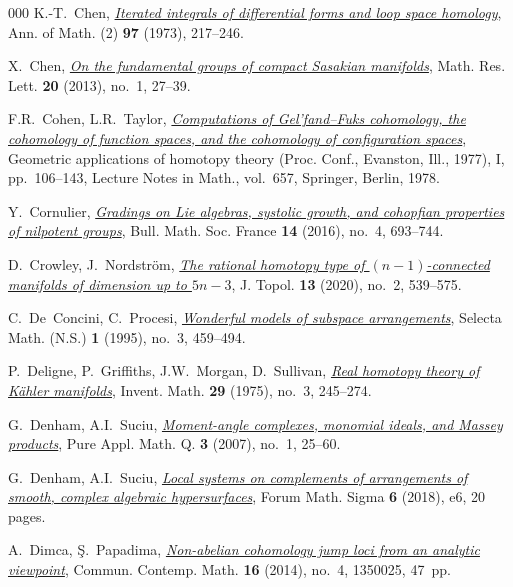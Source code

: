 \documentclass{article}
\numberwithin{equation}{section}
\theoremstyle{definition}
\begin{document}
\begin{thebibliography}{000}
 K.-T.~Chen,
\href{https://dx.doi.org/10.2307/1970846}%
{\emph{Iterated integrals of differential forms and loop space homology}}, 
Ann. of Math. (2) \textbf{97} (1973), 217--246.

  X.~Chen, 
\href{https://dx.doi.org/10.4310/MRL.2013.v20.n1.a3}%
{\em On the fundamental groups of compact Sasakian manifolds}, 
Math. Res. Lett. \textbf{20} (2013), no.~1, 27--39.

 F.R.~Cohen, L.R.~Taylor, 
\href{https://dx.doi.org/10.1007/BFb0069229}%
{\em Computations of Gel'fand--Fuks cohomology, the cohomology of 
function spaces, and the cohomology of configuration spaces}, 
Geometric applications of homotopy theory (Proc. Conf., 
Evanston, Ill., 1977), I, pp.~106--143, 
Lecture Notes in Math., vol.~657, Springer, Berlin, 1978. 

 Y.~Cornulier, 
\href{https://dx.doi.org/10.24033/bsmf.2725}
{\em Gradings on Lie algebras, systolic growth, and cohopfian
properties of nilpotent groups}, Bull. Math. Soc. France 
\textbf{14} (2016), no.~4, 693--744. 

 D.~Crowley, J.~Nordstr\"{o}m, 
\href{https://dx.doi.org/10.1112/topo.12133}%
{\em The rational homotopy type of $(n-1)$-connected manifolds 
of dimension up to $5n-3$}, 
J. Topol. \textbf{13} (2020), no.~2, 539--575. 

 C.~De~Concini, C.~Procesi, 
\href{https://dx.doi.org/10.1007/BF01589496}%
{\em Wonderful models of subspace arrangements}, 
Selecta Math. (N.S.) \textbf{1} (1995), no.~3, 459--494.

  P.~Deligne, P.~Griffiths, J.W.~Morgan, D.~Sullivan,
\href{https://dx.doi.org/10.1007/BF01389853}%
{\em Real homotopy theory of {K}\"{a}hler manifolds},
Invent. Math. \textbf{29} (1975), no.~3, 245--274.

 G.~Denham, A.I.~Suciu,
\href{http://dx.doi.org/10.4310/PAMQ.2007.v3.n1.a2}%
{\em Moment-angle complexes, monomial ideals, 
and Massey products}, Pure Appl. Math. Q. 
\textbf{3} (2007), no.~1, 25--60. 

 G.~Denham, A.I.~Suciu,
\href{https://dx.doi.org/10.1017/fms.2018.5}%
{\em Local systems on complements of arrangements of smooth, 
complex algebraic hypersurfaces}, Forum Math. Sigma 
\textbf{6} (2018), e6, 20 pages.

 A.~Dimca, \c{S}.~Papadima,
\href{https://dx.doi.org/10.1142/S0219199713500259}%
{\em Non-abelian cohomology jump loci from an analytic viewpoint}, 
Commun. Contemp. Math. \textbf{16} (2014), 
no.~4, 1350025, 47~pp.  


\end{thebibliography}
\end{document}
